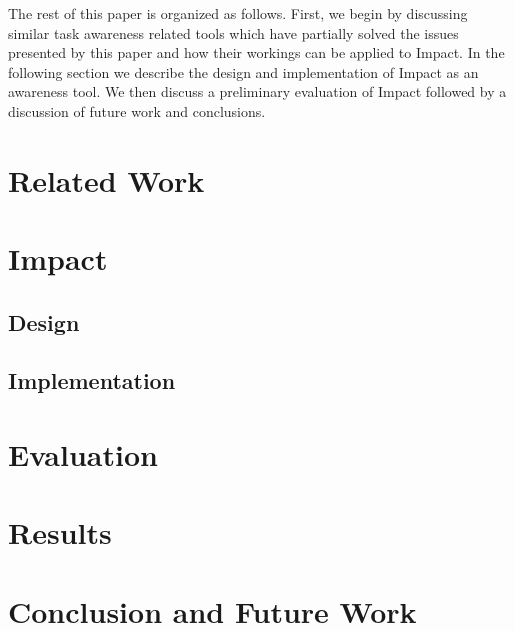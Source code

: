 \documentclass[conference]{IEEEtran}
\begin{document}
The rest of this paper is organized as follows. First, we begin by discussing
similar task awareness related tools which have partially solved the
issues presented by this paper and how their workings can be applied to 
Impact. In the following section we describe the design and implementation
of Impact as an awareness tool. We then discuss a preliminary evaluation of
Impact followed by a discussion of future work and conclusions.\\



\section{Related Work}



\section{Impact}

\subsection{Design}

\subsection{Implementation}



\section{Evaluation}



\section{Results}



\section{Conclusion and Future Work}






\end{document}
